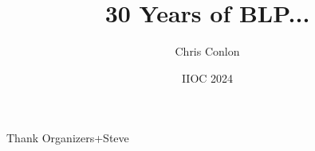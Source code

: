 

\usepackage{lipsum}
\usepackage{amsmath} 
\usepackage{amsthm} 
\usepackage{amssymb} 
\usepackage{mathtools}
\usepackage{dutchcal}


\newcommand{\vect}[1]{\boldsymbol{\mathbf{#1}}}
\newcommand{\pd}[2]{\frac{\partial{#1}}{\partial{#2}}}
\newcommand{\expect}[2]{\mathbb{E}_{#1}\left[{#2}\right]}
\newcommand{\expectsmall}[2]{\mathbb{E}_{#1}{#2}}
\newcommand{\expectsuper}[3]{\mathbb{E}_{#1}^{#2}\left[{#3}\right]}
\newcommand{\ind}[1]{\mathbbm{1}\left\{{#1}\right\}}
\newcommand{\prob}[1]{\mathbb{P}\left\{{#1}\right\}}
\newcommand{\derivative}[2]{\frac{d{#2}}{d{#1}}}
\newcommand{\cat}[1]{\citeasnoun{#1}}

\title{30 Years of BLP...}
\author{Chris Conlon}

\date{IIOC 2024}








\begin{frame}[plain] %
\titlepage
\end{frame}



\begin{frame}{Thank Organizers+Steve}
\end{frame}


